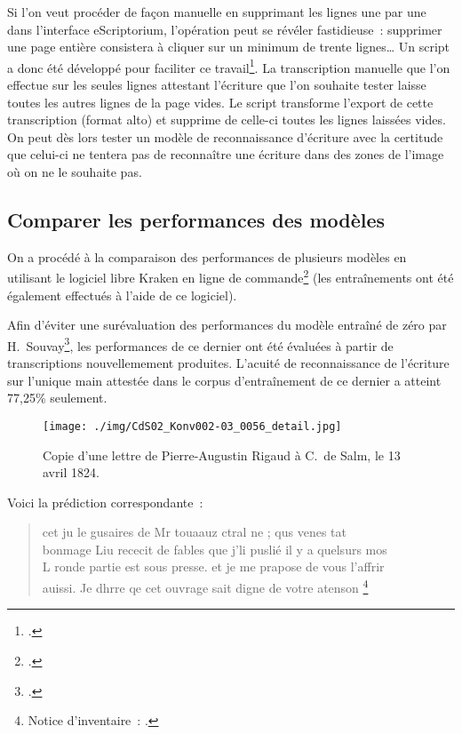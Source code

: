 \documentclass[a4paper,12pt,twoside]{book}
\begin{document}
				Si l'on veut procéder de façon manuelle en supprimant les lignes une par une dans l'interface eScriptorium, l'opération peut se révéler fastidieuse~: supprimer une page entière consistera à cliquer sur un minimum de trente lignes… Un script a donc été développé pour faciliter ce travail\footcite{biaySupprLignesVidesPy2022}. La transcription manuelle que l'on effectue sur les seules lignes attestant l'écriture que l'on souhaite tester laisse toutes les autres lignes de la page vides. Le script transforme l'export de cette transcription (format \gls{alto}) et supprime de celle-ci toutes les lignes laissées vides. On peut dès lors tester un modèle de reconnaissance d'écriture avec la certitude que celui-ci ne tentera pas de reconnaître une écriture dans des zones de l'image où on ne le souhaite pas.
				
			\subsection{Comparer les performances des modèles}
				On a procédé à la comparaison des performances de plusieurs modèles en utilisant le logiciel libre Kraken en ligne de commande\footcite{KrakenDocumentation} (les entraînements ont été également effectués à l'aide de ce logiciel).
				
				Afin d'éviter une surévaluation des performances du modèle entraîné de zéro par H.~Souvay\footcite{souvayCorrespondanceConstanceSalm2021}, les performances de ce dernier ont été évaluées à partir de transcriptions nouvellemement produites. L'acuité de reconnaissance de l'écriture sur l'unique main attestée dans le corpus d'entraînement de ce dernier a atteint 77,25\% seulement. 
				
				\begin{figure}[!h]
					\centering
					\texttt{[image: ./img/CdS02\_Konv002-03\_0056\_detail.jpg]}%
					\caption{Copie d'une lettre de Pierre-Augustin Rigaud à C.~de Salm, le 13 avril 1824.}%
					\label{lettre-rigaud}%
				\end{figure}
				
				Voici la prédiction correspondante~:
				
				\begin{quote}
					\textsf{cet ju le gusaires de Mr touaauz ctral ne ; qus venes tat\\
					bonmage Liu rececit de fables que j'li puslié il y a quelsurs mos\\
					L ronde partie est sous presse. et je me prapose de vous l'affrir\\
					auissi. Je dhrre qe cet ouvrage sait digne de votre atenson
					\footnote{Notice d'inventaire~: \cite{CdS02056}.}}
				\end{quote}
				
\end{document}
